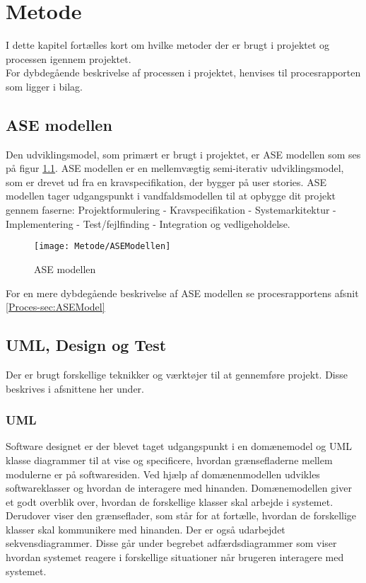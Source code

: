 \chapter{Metode}
I dette kapitel fortælles kort om hvilke metoder der er brugt i projektet og processen igennem projektet. \\
For dybdegående beskrivelse af processen i projektet, henvises til procesrapporten som ligger i bilag.

\section{ASE modellen}
Den udviklingsmodel, som primært er brugt i projektet, er ASE modellen som ses på figur \ref{fig:ASE}. ASE modellen\cite{ASE} er en mellemvægtig semi-iterativ udviklingsmodel, som er drevet ud fra en kravspecifikation, der bygger på user stories. ASE modellen tager udgangspunkt i vandfaldsmodellen til at opbygge dit projekt gennem faserne: Projektformulering - Kravspecifikation - Systemarkitektur -  Implementering -  Test/fejlfinding -  Integration og vedligeholdelse.

\begin{figure} [!ht]
	\begin{center}
		\texttt{[image: Metode/ASEModellen]}
	\end{center}
	\caption{ASE modellen}
	\label{fig:ASE}
\end{figure}

For en mere dybdegående beskrivelse af ASE modellen se procesrapportens afsnit \ref{Proces-sec:ASEModel} \\

\section{UML, Design og Test}
Der er brugt forskellige teknikker og værktøjer til at gennemføre projekt. Disse beskrives i afsnittene her under.
\subsection{UML}
Software designet er der blevet taget udgangspunkt i en domænemodel og UML\cite{UML} klasse diagrammer til at vise og specificere, hvordan grænsefladerne mellem modulerne er på softwaresiden.
Ved hjælp af domænenmodellen udvikles softwareklasser og hvordan de interagere med hinanden.
Domænemodellen giver et godt overblik over, hvordan de forskellige klasser skal arbejde i systemet. Derudover viser den grænseflader, som står for at fortælle, hvordan de forskellige klasser skal kommunikere med hinanden.
Der er også udarbejdet sekvensdiagrammer. Disse går under begrebet adfærdsdiagrammer som viser hvordan systemet reagere i forskellige situationer når brugeren interagere med systemet.

